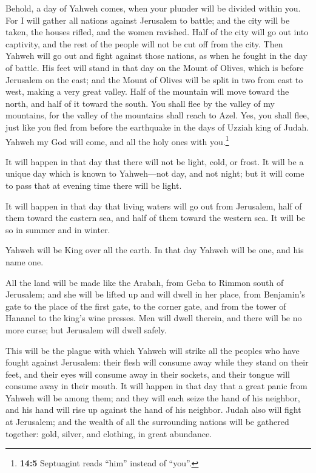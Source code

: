  Behold, a day of Yahweh comes, when your plunder will be
divided within you.  For I will gather all nations against
Jerusalem to battle; and the city will be taken, the houses rifled, and
the women ravished. Half of the city will go out into captivity, and the
rest of the people will not be cut off from the city. 
Then Yahweh will go out and fight against those nations, as when he
fought in the day of battle.  His feet will stand in that
day on the Mount of Olives, which is before Jerusalem on the east; and
the Mount of Olives will be split in two from east to west, making a
very great valley. Half of the mountain will move toward the north, and
half of it toward the south.  You shall flee by the valley
of my mountains, for the valley of the mountains shall reach to Azel.
Yes, you shall flee, just like you fled from before the earthquake in
the days of Uzziah king of Judah. Yahweh my God will come, and all the
holy ones with you.\footnote{\textbf{14:5} Septuagint reads ``him''
  instead of ``you''.}

 It will happen in that day that there will not be light,
cold, or frost.  It will be a unique day which is known to
Yahweh---not day, and not night; but it will come to pass that at
evening time there will be light.

 It will happen in that day that living waters will go out
from Jerusalem, half of them toward the eastern sea, and half of them
toward the western sea. It will be so in summer and in winter.

 Yahweh will be King over all the earth. In that day
Yahweh will be one, and his name one.

 All the land will be made like the Arabah, from Geba to
Rimmon south of Jerusalem; and she will be lifted up and will dwell in
her place, from Benjamin's gate to the place of the first gate, to the
corner gate, and from the tower of Hananel to the king's wine presses.
 Men will dwell therein, and there will be no more curse;
but Jerusalem will dwell safely.

 This will be the plague with which Yahweh will strike
all the peoples who have fought against Jerusalem: their flesh will
consume away while they stand on their feet, and their eyes will consume
away in their sockets, and their tongue will consume away in their
mouth.  It will happen in that day that a great panic
from Yahweh will be among them; and they will each seize the hand of his
neighbor, and his hand will rise up against the hand of his neighbor.
 Judah also will fight at Jerusalem; and the wealth of
all the surrounding nations will be gathered together: gold, silver, and
clothing, in great abundance.

